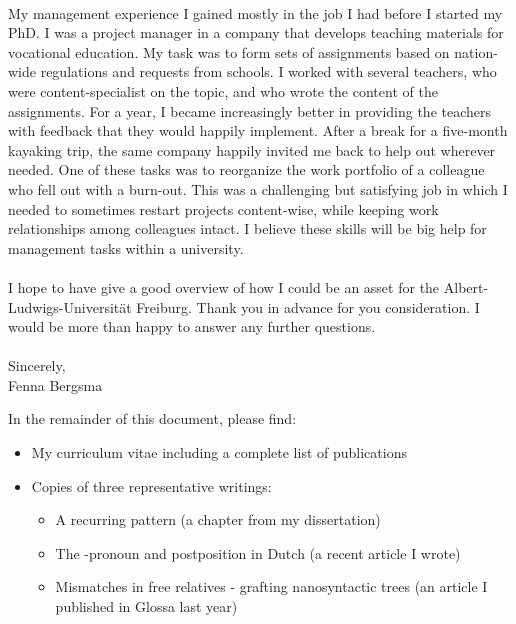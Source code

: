 \documentclass[12pt]{article}
\begin{document}
\phantom{x}\\

My management experience I gained mostly in the job I had before I started my PhD. I was a project manager in a company that develops teaching materials for vocational education. My task was to form sets of assignments based on nation-wide regulations and requests from schools. I worked with several teachers, who were content-specialist on the topic, and who wrote the content of the assignments. For a year, I became increasingly better in providing the teachers with feedback that they would happily implement. After a break for a five-month kayaking trip, the same company happily invited me back to help out wherever needed. One of these tasks was to reorganize the work portfolio of a colleague who fell out with a burn-out. This was a challenging but satisfying job in which I needed to sometimes restart projects content-wise, while keeping work relationships among colleagues intact. I believe these skills will be big help for management tasks within a university.\\

\phantom{x}\\

I hope to have give a good overview of how I could be an asset for the Albert-Ludwigs-Universität Freiburg. Thank you in advance for you consideration. I would be more than happy to answer any further questions.\\

\phantom{x}\\



Sincerely,\\
Fenna Bergsma










\newpage

In the remainder of this document, please find:

\begin{itemize}
  \item My curriculum vitae including a complete list of publications
  \item Copies of three representative writings:
  \begin{itemize}
    \item A recurring pattern (a chapter from my dissertation)
    \item The -pronoun and postposition  in Dutch (a recent article I wrote)
    \item Mismatches in free relatives - grafting nanosyntactic trees (an article I published in Glossa last year)
  \end{itemize}
\end{itemize}
\end{document}
